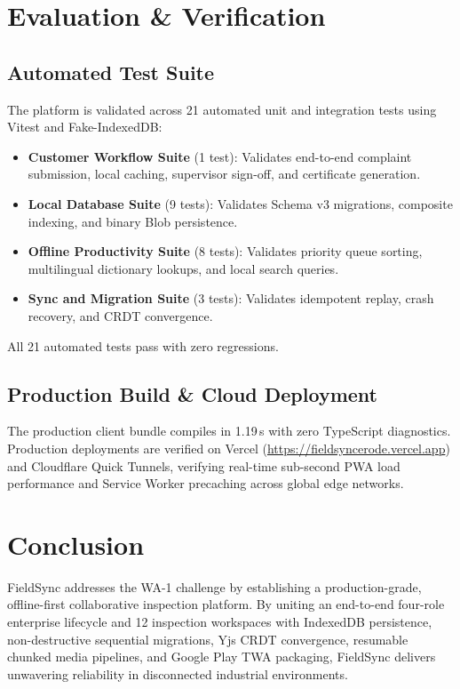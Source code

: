 \documentclass[conference]{IEEEtran}
\begin{document}
\section{Evaluation \& Verification}

\subsection{Automated Test Suite}
The platform is validated across 21 automated unit and integration tests using Vitest and Fake-IndexedDB:
\begin{itemize}\setlength{\itemsep}{1pt}
    \item \textbf{Customer Workflow Suite} (1 test): Validates end-to-end complaint submission, local caching, supervisor sign-off, and certificate generation.
    \item \textbf{Local Database Suite} (9 tests): Validates Schema v3 migrations, composite indexing, and binary Blob persistence.
    \item \textbf{Offline Productivity Suite} (8 tests): Validates priority queue sorting, multilingual dictionary lookups, and local search queries.
    \item \textbf{Sync and Migration Suite} (3 tests): Validates idempotent replay, crash recovery, and CRDT convergence.
\end{itemize}
All 21 automated tests pass with zero regressions.

\subsection{Production Build \& Cloud Deployment}
The production client bundle compiles in 1.19\,s with zero TypeScript diagnostics. Production deployments are verified on Vercel (\url{https://fieldsyncerode.vercel.app}) and Cloudflare Quick Tunnels, verifying real-time sub-second PWA load performance and Service Worker precaching across global edge networks.

\section{Conclusion}
FieldSync addresses the WA-1 challenge by establishing a production-grade, offline-first collaborative inspection platform. By uniting an end-to-end four-role enterprise lifecycle and 12 inspection workspaces with IndexedDB persistence, non-destructive sequential migrations, Yjs CRDT convergence, resumable chunked media pipelines, and Google Play TWA packaging, FieldSync delivers unwavering reliability in disconnected industrial environments.



\end{document}
